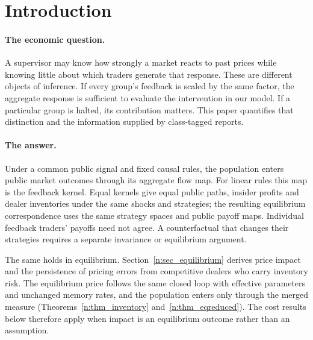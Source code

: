 \documentclass[12pt]{article}
\theoremstyle{definition}
\theoremstyle{remark}
\begin{document}
\section{Introduction}\label{n:intro}

\paragraph{The economic question.} A supervisor may know how strongly a market reacts to past prices while knowing little about which traders generate that response. These are different objects of inference. If every group's feedback is scaled by the same factor, the aggregate response is sufficient to evaluate the intervention in our model. If a particular group is halted, its contribution matters. This paper quantifies that distinction and the information supplied by class-tagged reports.

\paragraph{The answer.} Under a common public signal and fixed causal rules, the population enters public market outcomes through its aggregate flow map. For linear rules this map is the feedback kernel. Equal kernels give equal public paths, insider profits and dealer inventories under the same shocks and strategies; the resulting equilibrium correspondence uses the same strategy spaces and public payoff maps. Individual feedback traders' payoffs need not agree. A counterfactual that changes their strategies requires a separate invariance or equilibrium argument.

The same holds in equilibrium. Section~\ref{n:sec_equilibrium} derives price impact and the persistence of pricing errors from competitive dealers who carry inventory risk. The equilibrium price follows the same closed loop with effective parameters and unchanged memory rates, and the population enters only through the merged measure (Theorems~\ref{n:thm_inventory} and~\ref{n:thm_eqreduced}). The cost results below therefore apply when impact is an equilibrium outcome rather than an assumption.
\end{document}
